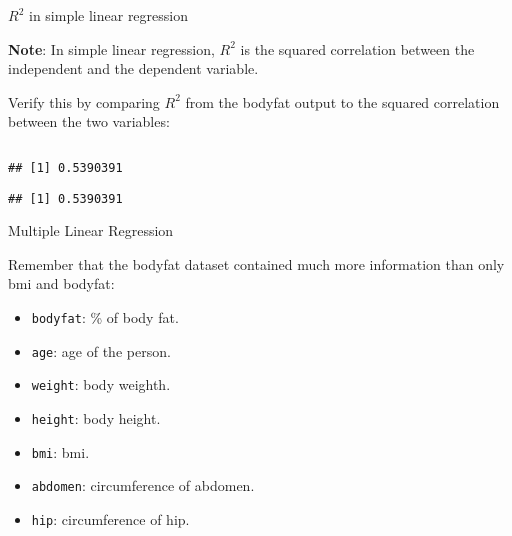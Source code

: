 \documentclass[10pt,ignorenonframetext,]{beamer}
\newenvironment{Shaded}{\begin{snugshade}}{\end{snugshade}}
\newcommand{\DecValTok}[1]{\textcolor[rgb]{0.00,0.00,0.81}{#1}}
\newcommand{\KeywordTok}[1]{\textcolor[rgb]{0.13,0.29,0.53}{\textbf{#1}}}
\newcommand{\NormalTok}[1]{#1}
\newcommand{\OperatorTok}[1]{\textcolor[rgb]{0.81,0.36,0.00}{\textbf{#1}}}
\providecommand{\tightlist}{%
  \setlength{\itemsep}{0pt}\setlength{\parskip}{0pt}}
\begin{document}
\begin{frame}[fragile]

\begin{block}{\(R^2\) in simple linear regression}

\vspace{3mm}

\textbf{Note}: In simple linear regression, \(R^2\) is the squared
correlation between the independent and the dependent variable.

\vspace{6mm}

Verify this by comparing \(R^2\) from the bodyfat output to the squared
correlation between the two variables:

\(~\)

\scriptsize

\begin{Shaded}
\end{Shaded}

\begin{verbatim}
## [1] 0.5390391
\end{verbatim}

\begin{Shaded}
\end{Shaded}

\begin{verbatim}
## [1] 0.5390391
\end{verbatim}

\end{block}

\end{frame}

\begin{frame}[fragile]{Multiple Linear Regression}
\protect\hypertarget{multiple-linear-regression}{}

Remember that the bodyfat dataset contained much more information than
only bmi and bodyfat:

\begin{itemize}
\tightlist
\item
  \texttt{bodyfat}: \% of body fat.
\item
  \texttt{age}: age of the person.
\item
  \texttt{weight}: body weighth.
\item
  \texttt{height}: body height.
\item
  \texttt{bmi}: bmi.
\item
  \texttt{abdomen}: circumference of abdomen.
\item
  \texttt{hip}: circumference of hip.
\end{itemize}

\end{frame}
\end{document}
